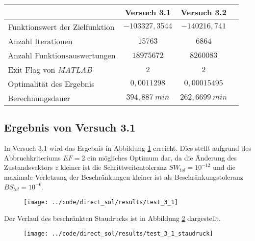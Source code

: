 \begin{table}[H]
    \centering
    \label{tab:Versuch3_TA}
    \begin{tabularx}{.9\textwidth}{Zccc}
        \toprule
         & \textbf{Versuch 3.1} & \textbf{Versuch 3.2} \\
        \midrule
        Funktionswert der Zielfunktion & $-103327,3544$ & $-140216,741$ \\
        Anzahl Iterationen & $15763$ & $6864$ \\
        Anzahl Funktionsauswertungen & $18975672$ & $8260083$ \\
        Exit Flag von \textit{MATLAB} & $2$ & $2$ \\
        Optimalität des Ergebnis & $0,0011298$ & $0,00015495$ \\
        Berechnungsdauer & $394,887 \ min$ & $262,6699 \ min$ \\
        \bottomrule
    \end{tabularx}
\end{table}





\subsection{Ergebnis von Versuch 3.1}\label{kap:Versuch31}
In Versuch 3.1 wird das Ergebnis in Abbildung \ref{img:test_3_1} erreicht. Dies stellt aufgrund des Abbruchkriteriums $EF = 2$ ein mögliches Optimum dar, da die Änderung des Zustandsvektors $z$ kleiner ist die Schrittweitentoleranz $SW_{tol} = 10^{-12}$ und die maximale Verletzung der Beschränkungen kleiner ist als Beschränkungstoleranz $BS_{tol} = 10^{-6}$.
\begin{figure}[H]
\begin{center}
\texttt{[image: ../code/direct\_sol/results/test\_3\_1]}
 \label{img:test_3_1}
\end{center}
\end{figure}
Der Verlauf des beschränkten Staudrucks ist in Abbildung \ref{img:test_3_1_staudruck} dargestellt.
\begin{figure}[H]
\begin{center}
\texttt{[image: ../code/direct\_sol/results/test\_3\_1\_staudruck]}
 \label{img:test_3_1_staudruck}
\end{center}
\end{figure}




